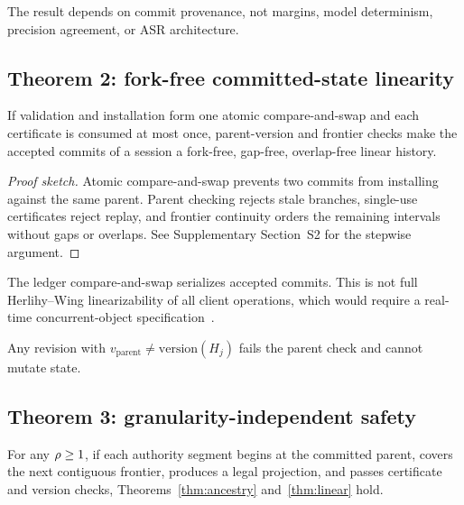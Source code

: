 The result depends on commit provenance, not margins, model determinism,
precision agreement, or ASR architecture.

\subsection{Theorem 2: fork-free committed-state linearity}\label{sec:dgft:thm2}

\begin{theorem}\label{thm:linear}
If validation and installation form one atomic compare-and-swap and each
certificate is consumed at most once, parent-version and frontier checks make
the accepted commits of a session a fork-free, gap-free, overlap-free linear
history.
\end{theorem}

\begin{proof}[Proof sketch]
Atomic compare-and-swap prevents two commits from installing against the same
parent. Parent checking rejects stale branches, single-use certificates reject
replay, and frontier continuity orders the remaining intervals without gaps
or overlaps. See Supplementary Section~S2 for the stepwise argument.
\end{proof}

\begin{remark}\label{rem:not-linearizable}
The ledger compare-and-swap serializes accepted commits. This is not full
Herlihy--Wing linearizability of all client operations, which would require a
real-time concurrent-object specification~\cite{herlihy1990linearizability}.
\end{remark}

\begin{corollary}\label{cor:stale}
Any revision with $v_{\mathrm{parent}}\neq\mathrm{version}(H_j)$ fails the
parent check and cannot mutate state.
\end{corollary}

\subsection{Theorem 3: granularity-independent safety}\label{sec:dgft:thm3}

\begin{theorem}\label{thm:gran}
For any $\rho\geq1$, if each authority segment begins at the committed
parent, covers the next contiguous frontier, produces a legal projection, and
passes certificate and version checks, Theorems~\ref{thm:ancestry}
and~\ref{thm:linear} hold.
\end{theorem}

